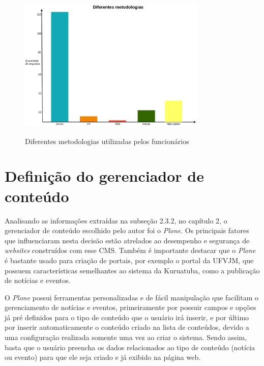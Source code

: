 \begin{figure}[htb]
 \centering
 \caption{Diferentes metodologias utilizadas pelos funcionários}
 \includegraphics[width=0.8\textwidth]{figuras/diferentes-metodologias}
 \label{ageis-microsoft}
\end{figure}


\hspace{2.5cm}
\section{Definição do gerenciador de conteúdo}
\label{sec:defCMS}

\hspace{2.5cm}

Analisando as informações extraídas na subseção 2.3.2, no capítulo 2, o gerenciador de conteúdo escolhido pelo autor foi o \textit{Plone}. Os principais fatores que influenciaram nesta decisão estão atrelados ao desempenho e segurança de \textit{websites} construídos com esse CMS. Também é importante destacar que o \textit{Plone} é bastante usado para criação de portais, por exemplo o portal da UFVJM, que possuem características semelhantes ao sistema da Kuruatuba, como a publicação de notícias e eventos. 

O \textit{Plone} possui ferramentas personalizadas e de fácil manipulação que facilitam o gerenciamento de notícias e eventos, primeiramente por possuir campos e opções já pré definidos para o tipo de conteúdo que o usuário irá inserir, e por último por inserir automaticamente o conteúdo criado na lista de conteúdos, devido a uma configuração realizada somente uma vez ao criar o sistema. Sendo assim, basta que o usuário preencha os dados relacionados ao tipo de conteúdo (notícia ou evento) para que ele seja criado e já exibido na página web.

